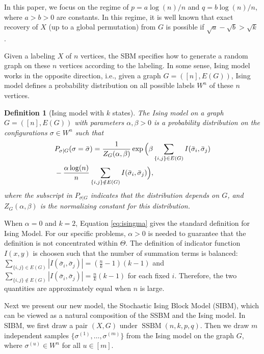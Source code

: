\documentclass[conference]{IEEEtran}
\newtheorem{definition}{Definition}%
\DeclareMathOperator{\SSBM}{SSBM}
\begin{document}
In this paper, we focus on the regime of $p=a\log(n)/n$ and $q=b\log(n)/n$, where $a>b> 0$ are constants. In this regime, it is well known that exact recovery of $X$ (up to a global permutation) from $G$ is possible if $\sqrt{a}-\sqrt{b} > \sqrt{k}$ \cite{abbe2015exact}.
 
Given a labeling $X$ of $n$ vertices, the SBM specifies how to generate a random graph on these $n$ vertices according to the labeling. In some sense, Ising model works in the opposite direction, i.e., given a graph $G=([n],E(G))$, Ising model defines a probability distribution on all possible labels $W^n$ of these $n$ vertices. 

 
\begin{definition}[Ising model with $k$ states]
The Ising model on a graph $G=([n],E(G))$ with parameters $\alpha,\beta>0$ is a probability distribution on the configurations $\sigma\in W^n$ such that
\begin{align} \label{eq:isingma}
&P_{\sigma|G}(\sigma=\bar{\sigma})=\frac{1}{Z_G(\alpha,\beta)}
\exp\Big(\beta \sum_{\{i,j\}\in E(G)} I(\bar{\sigma}_i ,\bar{\sigma}_j)\notag\\
&-\frac{\alpha\log(n)}{n} \sum_{\{i,j\}\notin E(G)} I(\bar{\sigma}_i, \bar{\sigma}_j)\Big) ,
\end{align}
where the subscript in $P_{\sigma|G}$ indicates that the distribution depends on $G$, and
$Z_G(\alpha,\beta)$ is the normalizing constant for this distribution.
\end{definition}

When $\alpha=0$ and $k=2$, Equation \eqref{eq:isingma} gives the standard definition for Ising Model.
For our specific problems, $\alpha > 0$ is needed to guarantee that the definition is not concentrated within
$\Theta$. The definition of indicator function $I(x, y)$ is choosen such that the number of summation terms is balanced: $\sum_{\{i,j\}\in E(G)} | I(\bar{\sigma}_i ,\bar{\sigma}_j) | = (\frac{n}{k} - 1)(k-1)$ and $\sum_{\{i,j\}\not\in E(G)} | I(\bar{\sigma}_i ,\bar{\sigma}_j)| = \frac{n}{k} (k-1)$ for each fixed $i$. Therefore, the two
quantities are approximately equal when $n$ is large.

Next we present our new model, the Stochastic Ising Block Model (SIBM), which can be viewed as a natural composition of the SSBM and the Ising model. In SIBM, we first draw a pair $(X,G)$ under $\SSBM(n,k,p,q)$.  Then we draw $m$ independent samples $\{\sigma^{(1)},\dots,\sigma^{(m)}\}$ from the Ising model on the graph $G$, where $\sigma^{(u)}\in W^n$ for all $u\in[m]$.
\end{document}
